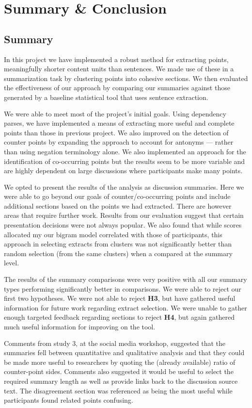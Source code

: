\chapter{Summary \& Conclusion \label{chap:conclusion}}
  \section{Summary}
    In this project we have implemented a robust method for extracting points, meaningfully shorter content units than sentences. We made use of these in a summarization task by clustering points into cohesive sections. We then evaluated the effectiveness of our approach by comparing our summaries against those generated by a baseline statistical tool that uses sentence extraction.

    We were able to meet most of the project's initial goals. Using dependency parses, we have implemented a means of extracting more useful and complete points than those in previous project. We also improved on the detection of counter points by expanding the approach to account for antonyms --- rather than using negation terminology alone. We also implemented an approach for the identification of co-occurring points but the results seem to be more variable and are highly dependent on large discussions where participants make many points.

    We opted to present the results of the analysis as discussion summaries. Here we were able to go beyond our goals of counter/co-occurring points and include additional sections based on the points we had extracted. There are however areas that require further work. Results from our evaluation suggest that certain presentation decisions were not always popular. We also found that while scores allocated my our bigram model correlated with those of participants, this approach in selecting extracts from clusters was not significantly better than random selection (from the same clusters) when a compared at the summary level.

    The results of the summary comparisons were very positive with all our summary types performing significantly better in comparisons. We were able to reject our first two hypotheses. We were not able to reject \textbf{H3}, but have gathered useful information for future work regarding extract selection. We were unable to gather enough targeted feedback regarding sections to reject \textbf{H4}, but again gathered much useful information for improving on the tool.

    Comments from study 3, at the social media workshop, suggested that the summaries fell between quantitative and qualitative analysis and that they could be made more useful to researchers by quoting the (already available) ratio of counter-point sides. Comments also suggested it would be useful to select the required summary length as well as provide links back to the discussion source text. The disagreement section was referenced as being the most useful while participants found related points confusing.

